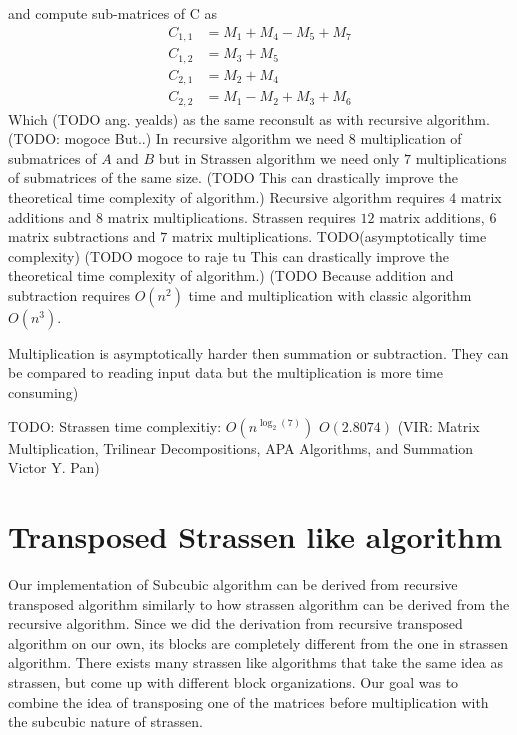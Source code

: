 \documentclass[a4paper,11pt]{article}
\begin{document}
and compute sub-matrices of C as
\begin{align*}
C_{1,1} &= M_{1} + M_{4} - M_{5} + M_{7} \\
C_{1,2} &= M_{3} + M_{5} \\
C_{2,1} &= M_{2} + M_{4} \\
C_{2,2} &= M_{1} - M_{2} + M_{3} + M_{6}
\end{align*}
Which (TODO ang. yealds) as the same reconsult as with recursive algorithm.
(TODO: mogoce But..)
In recursive algorithm we need $8$ multiplication of submatrices of $A$ and $B$ but in Strassen algorithm we need only $7$ multiplications of submatrices of the same size. (TODO This can drastically improve the theoretical time complexity of algorithm.) Recursive algorithm requires $4$ matrix additions and $8$ matrix multiplications. Strassen requires $12$ matrix additions, $6$ matrix subtractions and $7$ matrix multiplications. TODO(asymptotically time complexity)
(TODO mogoce to raje tu This can drastically improve the theoretical time complexity of algorithm.)
(TODO Because addition and subtraction requires $O(n^{2})$ time and multiplication with classic algorithm $O(n^{3})$. 

Multiplication is asymptotically harder then summation or subtraction. 
They can be compared to reading input data but the multiplication is more time consuming)


TODO: Strassen time complexitiy: 
$O(n^{\log_{2}(7)})$
$O(2.8074)$
(VIR: Matrix Multiplication, Trilinear Decompositions,
APA Algorithms, and Summation
Victor Y. Pan)


\section{Transposed Strassen like algorithm}

Our implementation of Subcubic algorithm can be derived from recursive transposed algorithm similarly to how strassen algorithm can be derived from the recursive algorithm. 
Since we did the derivation from recursive transposed algorithm on our own, its blocks are completely different from the one in strassen algorithm. There exists many strassen like algorithms that take the same idea as strassen, but come up with different block organizations. Our goal was to combine the idea of transposing one of the matrices before multiplication with the subcubic nature of strassen.
\end{document}
